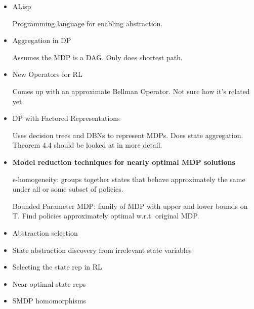 \documentclass{article}
\begin{document}
\begin{itemize}
\item ALisp~\cite{andre2002state}

Programming language for enabling abstraction.

\item Aggregation in DP~\cite{Bean2011}

Assumes the MDP is a DAG. Only does shortest path.

\item New Operators for RL~\cite{Bellemare2015}

Comes up with an approximate Bellman Operator. Not sure how it's related yet.

\item DP with Factored Representations~\cite{Boutilier2000}

Uses decision trees and DBNs to represent MDPs. Does state aggregation. Theorem 4.4 should be looked at in more detail.

\item {\bf Model reduction techniques for nearly optimal MDP solutions}~\cite{dean1997model}

$\epsilon$-homogeneity: groups together states that behave approximately the same under all or some subset of policies.

Bounded Parameter MDP: family of MDP with upper and lower bounds on T. Find policies approximately optimal w.r.t. original MDP.

\item Abstraction selection~\cite{jiang2015abstraction}

\item State abstraction discovery from irrelevant state variables~\cite{jong2005state}

\item Selecting the state rep in RL~\cite{maillard2011selecting}

\item Near optimal state reps~\cite{ortner2014selecting}

\item SMDP homomorphisms~\cite{ravindran2003smdp}

\end{itemize}




\end{document}
